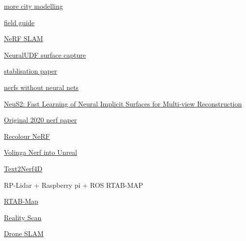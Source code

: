       \href{https://waymo.com/research/block-nerf/}{more city modelling}
     
      \href{https://github.com/3a1b2c3/seeingSpace/wiki/Hands-on:-Getting-started-and-Nerf-frameworks}{field
      guide}
     
      \href{https://github.com/ToniRV/NeRF-SLAM}{NeRF SLAM}
     
      \href{https://www.xxlong.site/NeuralUDF/}{NeuralUDF surface
      capture}
     
      \href{https://arxiv.org/abs/2102.06205}{stablisation paper}
     
      \href{https://alexyu.net/plenoxels/}{nerfs without neural nets}
     
      \href{https://vcai.mpi-inf.mpg.de/projects/NeuS2/}{NeuS2: Fast
      Learning of Neural Implicit Surfaces for Multi-view
      Reconstruction}
     
      \href{https://www.matthewtancik.com/nerf}{Original 2020 nerf
      paper}
     
      \href{https://sites.google.com/view/recolornerf?pli=1}{Recolour
      NeRF}
     
      \href{https://volinga.ai/}{Volinga Nerf into Unreal}
     
      \href{https://make-a-video3d.github.io/}{Text2Nerf4D}
     
   
    RP-Lidar + Raspberry pi + ROS RTAB-MAP

     
    \tightlist
     
      \href{http://introlab.github.io/rtabmap/}{RTAB-Map}
     
   
    \href{https://www.unrealengine.com/en-US/blog/realityscan-is-now-free-to-download-on-ios}{Reality
    Scan}
   
    \href{https://www.youtube.com/watch?v=CEC5UwPV9gY}{Drone SLAM}
   
 
